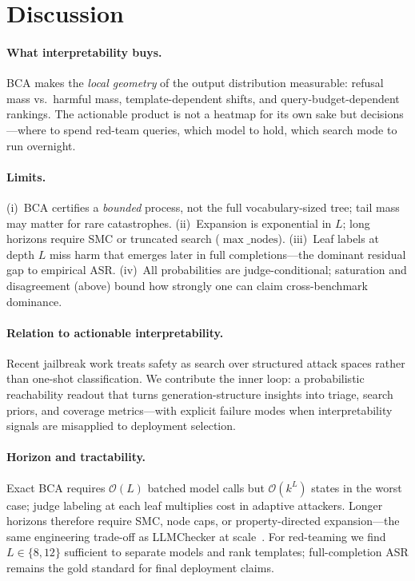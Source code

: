 \documentclass{article}
\newcommand{\BCA}{\textsc{BCA}}
\newcommand{\ASR}{\textsc{ASR}}
\newcommand{\SMC}{\textsc{SMC}}
\begin{document}
\section{Discussion}
\label{sec:discussion}

\paragraph{What interpretability buys.}
\BCA{} makes the \emph{local geometry} of the output distribution measurable: refusal mass vs.\ harmful mass, template-dependent shifts, and query-budget-dependent rankings.
The actionable product is not a heatmap for its own sake but decisions---where to spend red-team queries, which model to hold, which search mode to run overnight.

\paragraph{Limits.}
(i)~\BCA{} certifies a \emph{bounded} process, not the full vocabulary-sized tree; tail mass may matter for rare catastrophes.
(ii)~Expansion is exponential in $L$; long horizons require \SMC{} or truncated search ($\max\_\text{nodes}$).
(iii)~Leaf labels at depth $L$ miss harm that emerges later in full completions---the dominant residual gap to empirical \ASR{}.
(iv)~All probabilities are judge-conditional; saturation and disagreement (above) bound how strongly one can claim cross-benchmark dominance.

\paragraph{Relation to actionable interpretability.}
Recent jailbreak work treats safety as search over structured attack spaces rather than one-shot classification.
We contribute the inner loop: a probabilistic reachability readout that turns generation-structure insights into triage, search priors, and coverage metrics---with explicit failure modes when interpretability signals are misapplied to deployment selection.

\paragraph{Horizon and tractability.}
Exact \BCA{} requires $\mathcal{O}(L)$ batched model calls but $\mathcal{O}(k^L)$ states in the worst case; judge labeling at each leaf multiplies cost in adaptive attackers.
Longer horizons therefore require \SMC{}, node caps, or property-directed expansion---the same engineering trade-off as LLMChecker at scale~\citep{gross2025llmchecker}.
For red-teaming we find $L\in\{8,12\}$ sufficient to separate models and rank templates; full-completion \ASR{} remains the gold standard for final deployment claims.
\end{document}
